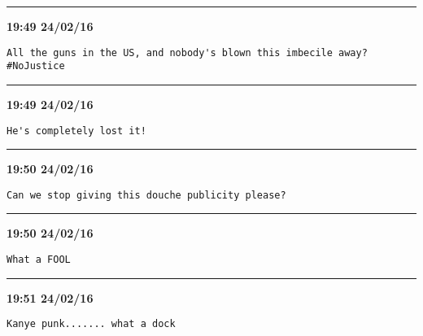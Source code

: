\hrule%

\begin{adjustwidth}{0cm}{0cm}
\footnotesize \textbf{19:49 24/02/16}

\begin{lstlisting}[breaklines, breakatwhitespace, basicstyle=\small, frame=leftline]
All the guns in the US, and nobody's blown this imbecile away?  #NoJustice
\end{lstlisting}
\end{adjustwidth}

\hrule%

\begin{adjustwidth}{0cm}{0cm}
\footnotesize \textbf{19:49 24/02/16}

\begin{lstlisting}[breaklines, breakatwhitespace, basicstyle=\small, frame=leftline]
He's completely lost it!
\end{lstlisting}
\end{adjustwidth}

\hrule%

\begin{adjustwidth}{0cm}{0cm}
\footnotesize \textbf{19:50 24/02/16}

\begin{lstlisting}[breaklines, breakatwhitespace, basicstyle=\small, frame=leftline]
Can we stop giving this douche publicity please?
\end{lstlisting}
\end{adjustwidth}

\hrule%

\begin{adjustwidth}{0cm}{0cm}
\footnotesize \textbf{19:50 24/02/16}

\begin{lstlisting}[breaklines, breakatwhitespace, basicstyle=\small, frame=leftline]
What a FOOL
\end{lstlisting}
\end{adjustwidth}

\hrule%

\begin{adjustwidth}{0cm}{0cm}
\footnotesize \textbf{19:51 24/02/16}

\begin{lstlisting}[breaklines, breakatwhitespace, basicstyle=\small, frame=leftline]
Kanye punk....... what a dock
\end{lstlisting}
\end{adjustwidth}

